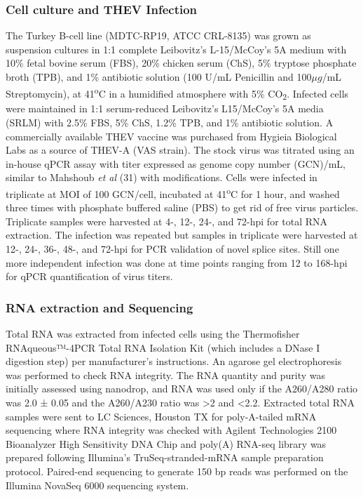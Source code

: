 \documentclass[
]{article}
\begin{document}
\subsubsection{Cell culture and THEV
Infection}\label{cell-culture-and-thev-infection}

The Turkey B-cell line (MDTC-RP19, ATCC CRL-8135) was grown as
suspension cultures in 1:1 complete Leibovitz's L-15/McCoy's 5A medium
with 10\% fetal bovine serum (FBS), 20\% chicken serum (ChS), 5\%
tryptose phosphate broth (TPB), and 1\% antibiotic solution (100 U/mL
Penicillin and 100\(\mu g\)/mL Streptomycin), at 41\textsuperscript{o}C
in a humidified atmosphere with 5\% CO\textsubscript{2}. Infected cells
were maintained in 1:1 serum-reduced Leibovitz's L15/McCoy's 5A media
(SRLM) with 2.5\% FBS, 5\% ChS, 1.2\% TPB, and 1\% antibiotic solution.
A commercially available THEV vaccine was purchased from Hygieia
Biological Labs as a source of THEV-A (VAS strain). The stock virus was
titrated using an in-house qPCR assay with titer expressed as genome
copy number (GCN)/mL, similar to Mahshoub \emph{et al} (31) with
modifications. Cells were infected in triplicate at MOI of 100 GCN/cell,
incubated at 41\textsuperscript{o}C for 1 hour, and washed three times
with phosphate buffered saline (PBS) to get rid of free virus particles.
Triplicate samples were harvested at 4-, 12-, 24-, and 72-hpi for total
RNA extraction. The infection was repeated but samples in triplicate
were harvested at 12-, 24-, 36-, 48-, and 72-hpi for PCR validation of
novel splice sites. Still one more independent infection was done at
time points ranging from 12 to 168-hpi for qPCR quantification of virus
titers.

\subsubsection{RNA extraction and
Sequencing}\label{rna-extraction-and-sequencing}

Total RNA was extracted from infected cells using the Thermofisher
RNAqueous™-4PCR Total RNA Isolation Kit (which includes a DNase I
digestion step) per manufacturer's instructions. An agarose gel
electrophoresis was performed to check RNA integrity. The RNA quantity
and purity was initially assessed using nanodrop, and RNA was used only
if the A260/A280 ratio was 2.0 ± 0.05 and the A260/A230 ratio was
\textgreater2 and \textless2.2. Extracted total RNA samples were sent to
LC Sciences, Houston TX for poly-A-tailed mRNA sequencing where RNA
integrity was checked with Agilent Technologies 2100 Bioanalyzer High
Sensitivity DNA Chip and poly(A) RNA-seq library was prepared following
Illumina's TruSeq-stranded-mRNA sample preparation protocol. Paired-end
sequencing to generate 150 bp reads was performed on the Illumina
NovaSeq 6000 sequencing system.
\end{document}

